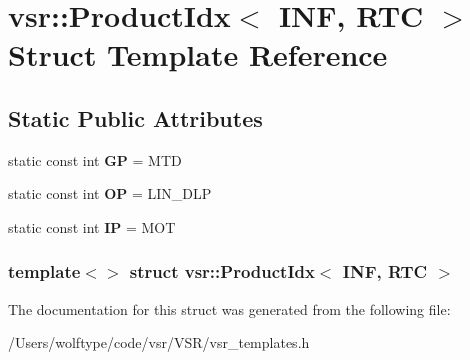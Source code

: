 \hypertarget{structvsr_1_1_product_idx_3_01_i_n_f_00_01_r_t_c_01_4}{\section{vsr\-:\-:Product\-Idx$<$ I\-N\-F, R\-T\-C $>$ Struct Template Reference}
\label{structvsr_1_1_product_idx_3_01_i_n_f_00_01_r_t_c_01_4}
}
\subsection*{Static Public Attributes}
\begin{DoxyCompactItemize}
\item 
\hypertarget{structvsr_1_1_product_idx_3_01_i_n_f_00_01_r_t_c_01_4_acdc9528642c5df6d56ae98858e12be0b}{static const int {\bfseries G\-P} = M\-T\-D}\label{structvsr_1_1_product_idx_3_01_i_n_f_00_01_r_t_c_01_4_acdc9528642c5df6d56ae98858e12be0b}

\item 
\hypertarget{structvsr_1_1_product_idx_3_01_i_n_f_00_01_r_t_c_01_4_ac8cb727627e87a52ab00313bdfa0eb46}{static const int {\bfseries O\-P} = L\-I\-N\-\_\-\-D\-L\-P}\label{structvsr_1_1_product_idx_3_01_i_n_f_00_01_r_t_c_01_4_ac8cb727627e87a52ab00313bdfa0eb46}

\item 
\hypertarget{structvsr_1_1_product_idx_3_01_i_n_f_00_01_r_t_c_01_4_a00b05048f39773a28e3ff6e589d98cfc}{static const int {\bfseries I\-P} = M\-O\-T}\label{structvsr_1_1_product_idx_3_01_i_n_f_00_01_r_t_c_01_4_a00b05048f39773a28e3ff6e589d98cfc}

\end{DoxyCompactItemize}
\subsubsection*{template$<$$>$ struct vsr\-::\-Product\-Idx$<$ I\-N\-F, R\-T\-C $>$}



The documentation for this struct was generated from the following file\-:\begin{DoxyCompactItemize}
\item 
/\-Users/wolftype/code/vsr/\-V\-S\-R/vsr\-\_\-templates.\-h\end{DoxyCompactItemize}
